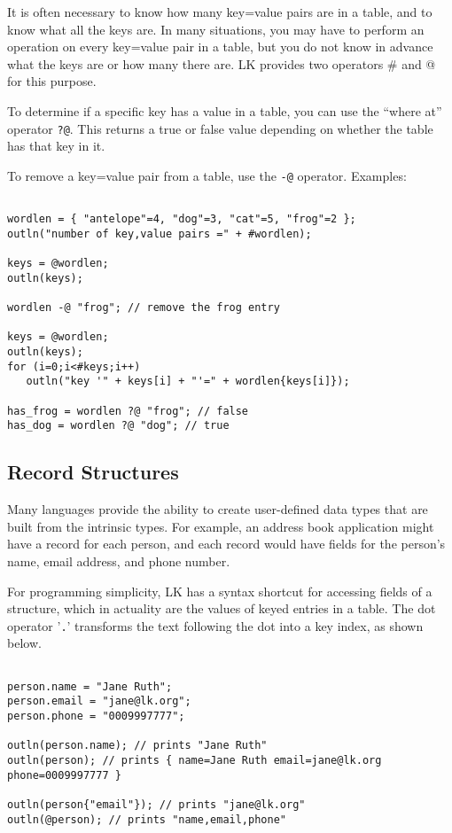 \documentclass{article}
\begin{document}
It is often necessary to know how many key=value pairs are in a table, and to know what all the keys are.  In many situations, you may have to perform an operation on every key=value pair in a table, but you do not know in advance what the keys are or how many there are.  LK provides two operators \# and @ for this purpose.

To determine if a specific key has a value in a table, you can use the ``where at'' operator \texttt{?@}.  This returns a true or false value depending on whether the table has that key in it.

To remove a key=value pair from a table, use the \texttt{-@} operator.  Examples:

\begin{verbatim}

wordlen = { "antelope"=4, "dog"=3, "cat"=5, "frog"=2 };
outln("number of key,value pairs =" + #wordlen);

keys = @wordlen;
outln(keys);

wordlen -@ "frog"; // remove the frog entry

keys = @wordlen;
outln(keys);
for (i=0;i<#keys;i++)
   outln("key '" + keys[i] + "'=" + wordlen{keys[i]});
   
has_frog = wordlen ?@ "frog"; // false
has_dog = wordlen ?@ "dog"; // true

\end{verbatim}

\subsection{Record Structures}

Many languages provide the ability to create user-defined data types that are built from the intrinsic types.  For example, an address book application might have a record for each person, and each record would have fields for the person's name, email address, and phone number.  

For programming simplicity, LK has a syntax shortcut for accessing fields of a structure, which in actuality are the values of keyed entries in a table.  The dot operator '\texttt{.}' transforms the text following the dot into a key index, as shown below.

\begin{verbatim}

person.name = "Jane Ruth";
person.email = "jane@lk.org";
person.phone = "0009997777";

outln(person.name); // prints "Jane Ruth"
outln(person); // prints { name=Jane Ruth email=jane@lk.org phone=0009997777 }

outln(person{"email"}); // prints "jane@lk.org"
outln(@person); // prints "name,email,phone"

\end{verbatim}
\end{document}
